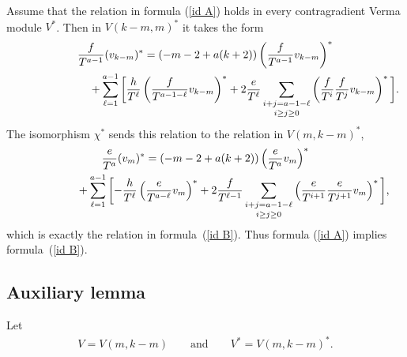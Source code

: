 Assume that the relation in formula (\ref{id A}) holds in every contragradient Verma module $V^*$. Then in $V(k-m, m)^*$ it takes the form
\begin{gather*}
\frac{f}{T^{a-1}} (v_{k-m})^* = (-m-2+ a(k+2))\left(\frac{f}{T^{a-1}}v_{k-m}\right)^* \nonumber \\
\hphantom{\frac{f}{T^{a-1}} (v_{k-m})^* =}{} + \sum_{\ell=1}^{a-1} \bigg[\frac{h}{T^\ell}\left(\frac{f}{T^{a-1-\ell}}v_{k-m}\right)^* + 2 \frac{e}{T^\ell}\mathop{\sum_{i+j=a-1-\ell}}_{i\geq j\geq 0}
\left(\frac{f}{T^i}\frac{f}{T^j}v_{k-m}\right)^*\bigg].%
\end{gather*}
The isomorphism $\chi^*$ sends this relation to the relation in $V(m,k-m)^*$,
\begin{gather*}
\frac{e}{T^{a}} (v_{m})^* = (-m-2+ a(k+2))\left(\frac{e}{T^{a}}v_{m}\right)^* \nonumber\\
\hphantom{\frac{e}{T^{a}} (v_{m})^* =}{} + \sum_{\ell=1}^{a-1} \bigg[{-}\frac{h}{T^\ell}\left(\frac{e}{T^{a-\ell}}v_{m}\right)^* + 2 \frac{f}{T^{\ell-1}}\mathop{\sum_{i+j=a-1-\ell}}_{i\geq j\geq 0}
\left(\frac{e}{T^{i+1}}\frac{e}{T^{j+1}}v_{m}\right)^*\bigg],%
\end{gather*}
which is exactly the relation in formula~(\ref{id B}). Thus formula (\ref{id A}) implies formula~(\ref{id B}).

\subsection{Auxiliary lemma}\label{subsec aux lemma}
Let
\begin{gather*}
V=V(m,k-m) \qquad \text{and} \qquad V^* = V(m,k-m)^*.
\end{gather*}

